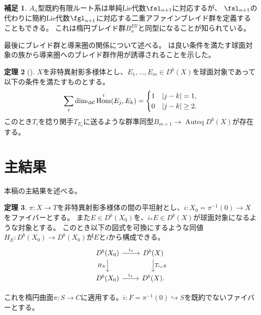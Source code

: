 \documentclass[uplatex,11pt,a4paper,dvipdfmx]{jsarticle}
\numberwithin{equation}{section}
\theoremstyle{definition}
\newtheorem{theorem}{定理}[section]
\newtheorem{remark}[theorem]{補足}
\DeclareMathOperator{\Hom}{\mathrm{Hom}}
\DeclareMathOperator{\Auteq}{\mathrm{Auteq}}
\begin{document}
\begin{remark}
    $A_n$型既約有限ルート系は単純Lie代数$\fsl_{n+1}$に対応するが、
    $\fsl_{n+1}$の代わりに簡約Lie代数$\fgl_{n+1}$に対応する二重アファインブレイド群を定義することもできる。
    これは楕円ブレイド群$B^{Ell}_n$と同型になることが知られている。
\end{remark}




最後にブレイド群と導来圏の関係について述べる。
\cite{MR1831820}は良い条件を満たす球面対象の族から導来圏へのブレイド群作用が誘導されることを示した。
\begin{theorem}[\cite{MR1831820}]
    $X$を非特異射影多様体とし、$E_1, \dots, E_m \in D^b(X)$を球面対象であって以下の条件を満たすものとする。
    \begin{equation}
        \sum_i\dim_\bC\Hom^i(E_j, E_k) = \begin{cases}
            1 & |j-k| = 1,    \\
            0 & |j-k| \geq 2.
        \end{cases}
    \end{equation}
    このとき$T_i$を捻り関手$T_{E_i}$に送るような群準同型$B_{m+1} \to \Auteq D^b(X)$が存在する。
\end{theorem}




\section{主結果}
本稿の主結果を述べる。
\begin{theorem}
    $\pi \colon X \to T$を非特異射影多様体の間の平坦射とし、$i \colon X_0 = \pi^{-1}(0) \to X$をファイバーとする。
    また$E \in D^b(X_0)$を、$i_*E \in D^b(X)$が球面対象になるような対象とする。
    このとき以下の図式を可換にするような同値$H_E \colon D^b(X_0) \to D^b(X_0)$が$E$と$i$から構成できる。
    \begin{equation}
        \begin{tikzcd}
            D^b(X_0) \arrow[r,"i_*"]\arrow[d, "H_E"'] & D^b(X) \arrow[d,"T_{i_*E}"]\\
            D^b(X_0) \arrow[r, "i_*"]& D^b(X).
        \end{tikzcd}
    \end{equation}
\end{theorem}

これを楕円曲面$\pi \colon S \to C$に適用する。$i \colon F = \pi^{-1}(0) \hookrightarrow S$を既約でないファイバーとする。
\end{document}
